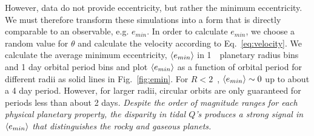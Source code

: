 However, \kepler data do not provide eccentricity, but rather the
minimum eccentricity. We must therefore transform these simulations
into a form that is directly comparable to an observable,
e.g. $e_{min}$. In order to calculate $e_{min}$, we choose a random
value for $\theta$ and calculate the velocity according to
Eq.~\ref{eq:velocity}. We calculate the average minimum eccentricity,
$\left< e_{min} \right>$ in 1~\rearth~planetary radius bins and 1 day orbital
period bins and plot $\left< e_{min} \right>$ as a function of orbital period
for different radii as solid lines in Fig.~\ref{fig:emin}. For $R <
2$~\rearth, $\left< e_{min} \right>
\sim 0$ up to about a 4 day period. However, for larger radii,
circular orbits are only guaranteed for periods less than about 2
days. \textit{Despite the order of magnitude ranges for each physical
  planetary property, the disparity in tidal $Q$'s produces a strong
  signal in $\left< e_{min} \right>$ that distinguishes the rocky and gaseous
  planets. }


